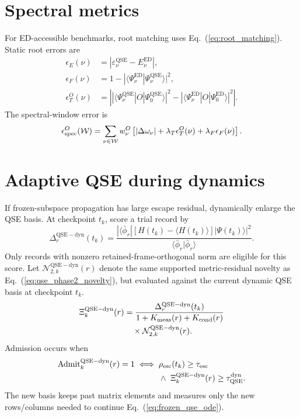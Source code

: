 \documentclass[
  reprint,
  amsmath,
  amssymb,
  aps,
  pra,
  nofootinbib,
  superscriptaddress,
  floatfix
]{revtex4-2}
\newcommand{\Wcal}{\mathcal{W}}
\newcommand{\dyn}{\mathrm{dyn}}
\newcommand{\qse}{\mathrm{QSE}}
\newcommand{\ed}{\mathrm{ED}}
\newcommand{\ket}[1]{|#1\rangle}
\newcommand{\bra}[1]{\langle #1|}
\newcommand{\braket}[2]{\langle #1|#2\rangle}
\newcommand{\expval}[1]{\langle #1\rangle}
\begin{document}
\section{Spectral metrics}
\label{app:spectral_metrics}

For ED-accessible benchmarks, root matching uses Eq.~(\ref{eq:root_matching}).  Static root errors are
\begin{align}
\epsilon_E(\nu)&=|\varepsilon_\nu^{\qse}-E_\nu^{\ed}|,
\nonumber\\
\epsilon_F(\nu)&=1-|\braket{\Psi_\nu^{\ed}}{\Psi_\nu^{\qse}}|^2,
\nonumber\\
\epsilon_T^O(\nu)&=
\left|
|\bra{\Psi_\nu^{\qse}}O\ket{\Psi_0^{\qse}}|^2
-
|\bra{\Psi_\nu^{\ed}}O\ket{\Psi_0^{\ed}}|^2
\right|.
\label{eq:app_root_metrics}
\end{align}
The spectral-window error is
\begin{equation}
\epsilon_{\rm spec}^{O}(\Wcal)
=
\sum_{\nu\in\Wcal}
w_\nu^{O}
\left[
|\Delta\omega_\nu|
+
\lambda_T\epsilon_T^O(\nu)
+
\lambda_F\epsilon_F(\nu)
\right].
\label{eq:app_spectral_error}
\end{equation}

\section{Adaptive QSE during dynamics}
\label{app:adaptive_qse_dynamics}

If frozen-subspace propagation has large escape residual, dynamically enlarge the QSE basis.  At checkpoint $t_k$, score a trial record by
\begin{equation}
\Delta_r^{\qse-\dyn}(t_k)
=
\frac{
|\bra{\bar\phi_r}
[H(t_k)-\expval{H(t_k)}]\ket{\Psi(t_k)}|^2
}{
\braket{\bar\phi_r}{\bar\phi_r}
}.
\label{eq:app_qse_dyn_gain}
\end{equation}
Only records with nonzero retained-frame-orthogonal norm are eligible for this
score.
Let $\mathcal N_{2,k}^{\qse-\dyn}(r)$ denote the same supported metric-residual novelty as Eq.~(\ref{eq:qse_phase2_novelty}), but evaluated against the current dynamic QSE basis at checkpoint $t_k$.
\begin{equation}
\begin{aligned}
\Xi_k^{\qse-\dyn}(r)
&=
\frac{
\Delta_r^{\qse-\dyn}(t_k)
}{
1+K_{\rm meas}(r)+K_{\rm cond}(r)
}
\\
&\quad\times
\mathcal N_{2,k}^{\qse-\dyn}(r).
\end{aligned}
\label{eq:app_adaptive_qse_score}
\end{equation}
Admission occurs when
\begin{equation}
\begin{aligned}
\operatorname{Admit}_{k}^{\qse-\dyn}(r)=1
\iff{}&
\rho_{\rm esc}(t_k)\ge\tau_{\rm esc}
\\
&\wedge\
\Xi_k^{\qse-\dyn}(r)\ge\tau_{\qse}^{\dyn}.
\end{aligned}
\label{eq:app_adaptive_qse_admit}
\end{equation}
The new basis keeps past matrix elements and measures only the new rows/columns needed to continue Eq.~(\ref{eq:frozen_qse_ode}).
\end{document}
